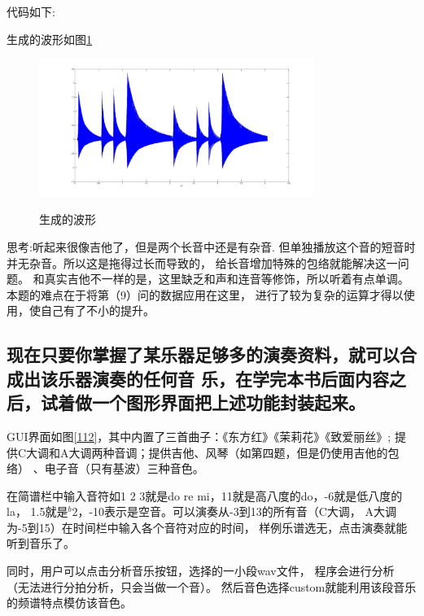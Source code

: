 \documentclass{ctexart}
\begin{document}
        代码如下:
        

        生成的波形如图\ref{111}
        \begin{figure}
            \centering
            \includegraphics[width=0.8\textwidth]{fmt/1_11.jpg}\\
            \caption{生成的波形\label{111}}
        \end{figure}

        思考:听起来很像吉他了，但是两个长音中还是有杂音.
        但单独播放这个音的短音时并无杂音。所以这是拖得过长而导致的，
        给长音增加特殊的包络就能解决这一问题。
        和真实吉他不一样的是，这里缺乏和声和连音等修饰，所以听着有点单调。
        本题的难点在于将第（9）问的数据应用在这里，
        进行了较为复杂的运算才得以使用，使自己有了不小的提升。

        \subsection{
            现在只要你掌握了某乐器足够多的演奏资料，就可以合成出该乐器演奏的任何音
            乐，在学完本书后面内容之后，试着做一个图形界面把上述功能封装起来。
        }

        GUI界面如图\ref{112}，其中内置了三首曲子：《东方红》《茉莉花》《致爱丽丝》;
        提供C大调和A大调两种音调；提供吉他、风琴（如第四题，但是仍使用吉他的包络）
        、电子音（只有基波）三种音色。

        在简谱栏中输入音符如1 2 3就是do re mi，11就是高八度的do，-6就是低八度的la，
        1.5就是$^b2$，-10表示是空音。可以演奏从-3到13的所有音（C大调，
        A大调为-5到15）在时间栏中输入各个音符对应的时间，
        样例乐谱选无，点击演奏就能听到音乐了。

        同时，用户可以点击分析音乐按钮，选择的一小段wav文件，
        程序会进行分析（无法进行分拍分析，只会当做一个音）。
        然后音色选择custom就能利用该段音乐的频谱特点模仿该音色。
\end{document}
